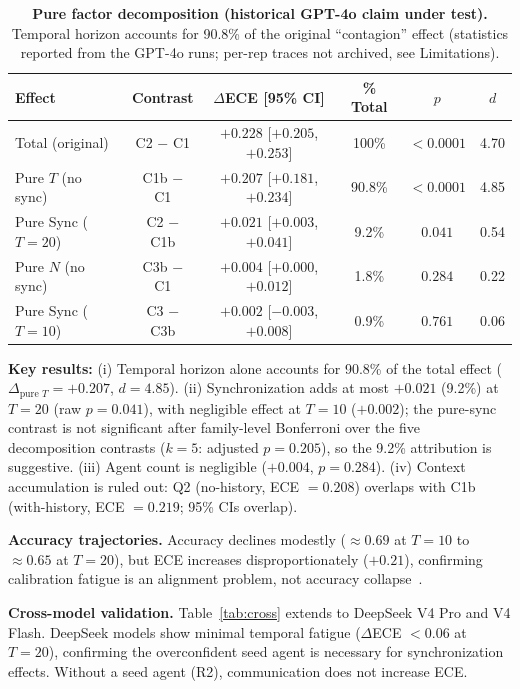 \documentclass[11pt]{article}
\theoremstyle{definition}
\theoremstyle{remark}
\begin{document}
\begin{table}[H]
\centering
\caption{\textbf{Pure factor decomposition (historical GPT-4o claim under test).} Temporal horizon accounts for 90.8\% of the original ``contagion'' effect (statistics reported from the GPT-4o runs; per-rep traces not archived, see Limitations).}
\label{tab:decomp}
\begin{tabular}{@{}lccccc@{}}
\toprule
Effect & Contrast & $\Delta$ECE [95\% CI] & \% Total & $p$ & $d$ \\
\midrule
Total (original) & C2 $-$ C1 & $+0.228$ [$+0.205$, $+0.253$] & 100\% & $<0.0001$ & 4.70 \\
Pure $T$ (no sync) & C1b $-$ C1 & $+0.207$ [$+0.181$, $+0.234$] & 90.8\% & $<0.0001$ & 4.85 \\
Pure Sync ($T{=}20$) & C2 $-$ C1b & $+0.021$ [$+0.003$, $+0.041$] & 9.2\% & $0.041$ & 0.54 \\
Pure $N$ (no sync) & C3b $-$ C1 & $+0.004$ [$+0.000$, $+0.012$] & 1.8\% & $0.284$ & 0.22 \\
Pure Sync ($T{=}10$) & C3 $-$ C3b & $+0.002$ [$-0.003$, $+0.008$] & 0.9\% & $0.761$ & 0.06 \\
\bottomrule
\end{tabular}
\end{table}

\textbf{Key results:} (i) Temporal horizon alone accounts for 90.8\% of the total effect ($\Delta_{\text{pure } T} = +0.207$, $d = 4.85$). (ii) Synchronization adds at most $+0.021$ (9.2\%) at $T{=}20$ (raw $p = 0.041$), with negligible effect at $T{=}10$ ($+0.002$); the pure-sync contrast is not significant after family-level Bonferroni over the five decomposition contrasts ($k{=}5$: adjusted $p = 0.205$), so the 9.2\% attribution is suggestive. (iii) Agent count is negligible ($+0.004$, $p = 0.284$). (iv) Context accumulation is ruled out: Q2 (no-history, ECE $= 0.208$) overlaps with C1b (with-history, ECE $= 0.219$; 95\% CIs overlap).

\textbf{Accuracy trajectories.} Accuracy declines modestly ($\approx 0.69$ at $T{=}10$ to $\approx 0.65$ at $T{=}20$), but ECE increases disproportionately ($+0.21$), confirming calibration fatigue is an alignment problem, not accuracy collapse~\citep{dodge2019show}.

\textbf{Cross-model validation.} Table~\ref{tab:cross} extends to DeepSeek V4 Pro and V4 Flash. DeepSeek models show minimal temporal fatigue ($\Delta$ECE $< 0.06$ at $T{=}20$), confirming the overconfident seed agent is necessary for synchronization effects. Without a seed agent (R2), communication does not increase ECE.
\end{document}
